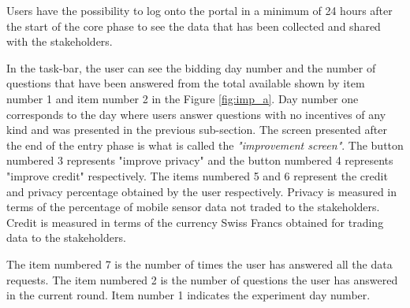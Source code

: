 Users have the possibility to log onto the portal in a minimum of 24 hours after the start of the core phase to see the data that has been collected and shared with the stakeholders. 

In the task-bar, the user can see the bidding day number and the number of questions that have been answered from the total available shown by item number 1 and item number 2 in the Figure \ref{fig:imp_a}. Day number one
corresponds to the day where users answer questions with no incentives of any kind and was presented in the previous sub-section. The screen presented after the end of the entry phase is what is called the \textit{"improvement screen"}. 
The button numbered 3
represents "improve privacy" and the button numbered 4 represents "improve credit" respectively. The items numbered 5 and 6 represent the credit   and privacy percentage obtained by the user respectively. Privacy is measured in terms of the percentage of mobile sensor data not traded to the stakeholders. Credit is measured in terms of the currency Swiss Francs obtained for trading data to the stakeholders. 

The item numbered 7 is the number of times the user has answered all the data requests. The item numbered 2 is the number of questions the user has answered in the current round. Item number 1 indicates the experiment day number.



